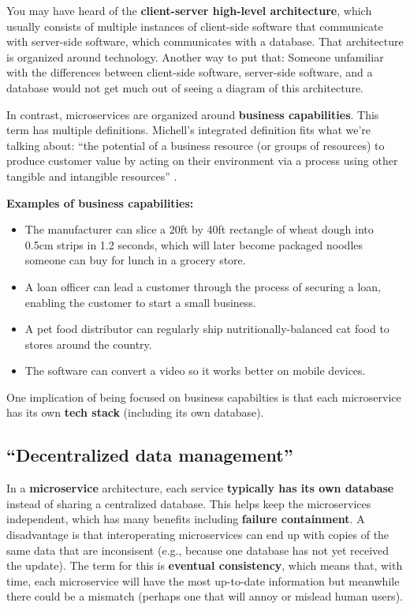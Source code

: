 You may have heard of the \textbf{client-server high-level architecture}, which usually consists of multiple instances of client-side software that communicate with server-side software, which communicates with a database. That architecture is organized around technology. Another way to put that: Someone unfamiliar with the differences between client-side software, server-side software, and a database would not get much out of seeing a diagram of this architecture. 

In contrast, microservices are organized around \textbf{business capabilities}. This term has multiple definitions. Michell's integrated definition fits what we're talking about: ``the potential of a business resource (or groups of resources) to produce customer value by acting on their environment via a process using other tangible and intangible resources'' \parencite{Michell2011AFA}. 

\spacer
\noindent\textbf{Examples of business capabilities:}\\

\begin{itemize}

\item The manufacturer can slice a 20ft by 40ft rectangle of wheat dough into 0.5cm strips in 1.2 seconds, which will later become packaged noodles someone can buy for lunch in a grocery store.

\item A loan officer can lead a customer through the process of securing a loan, enabling the customer to start a small business.

\item A pet food distributor can regularly ship nutritionally-balanced cat food to stores around the country.

\item The software can convert a video so it works better on mobile devices.

\end{itemize}

\spacer
One implication of being focused on business capabilties is that each microservice has its own \textbf{tech stack} (including its own database).

\nomargins
\subsection{``Decentralized data management''}

In a \textbf{microservice} architecture, each service \textbf{typically has its own database} instead of sharing a centralized database. This helps keep the microservices independent, which has many benefits including \textbf{failure containment}. A disadvantage is that interoperating microservices can end up with copies of the same data that are inconsisent (e.g., because one database has not yet received the update). The term for this is \textbf{eventual consistency}, which means that, with time, each microservice will have the most up-to-date information but meanwhile there could be a mismatch (perhaps one that will annoy or mislead human users).

